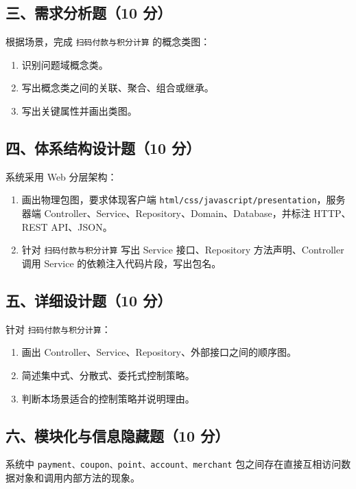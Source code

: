 \documentclass[UTF8,zihao=-4]{ctexart}
\begin{document}
\subsection{三、需求分析题（10 分）}


根据场景，完成 \texttt{扫码付款与积分计算} 的概念类图：


\begin{enumerate}
\item 识别问题域概念类。
\item 写出概念类之间的关联、聚合、组合或继承。
\item 写出关键属性并画出类图。
\end{enumerate}


\subsection{四、体系结构设计题（10 分）}


系统采用 Web 分层架构：


\begin{enumerate}
\item 画出物理包图，要求体现客户端 \texttt{html/css/javascript/presentation}，服务器端 Controller、Service、Repository、Domain、Database，并标注 HTTP、REST API、JSON。
\item 针对 \texttt{扫码付款与积分计算} 写出 Service 接口、Repository 方法声明、Controller 调用 Service 的依赖注入代码片段，写出包名。
\end{enumerate}


\subsection{五、详细设计题（10 分）}


针对 \texttt{扫码付款与积分计算}：


\begin{enumerate}
\item 画出 Controller、Service、Repository、外部接口之间的顺序图。
\item 简述集中式、分散式、委托式控制策略。
\item 判断本场景适合的控制策略并说明理由。
\end{enumerate}


\subsection{六、模块化与信息隐藏题（10 分）}


系统中 \texttt{payment、coupon、point、account、merchant} 包之间存在直接互相访问数据对象和调用内部方法的现象。
\end{document}
